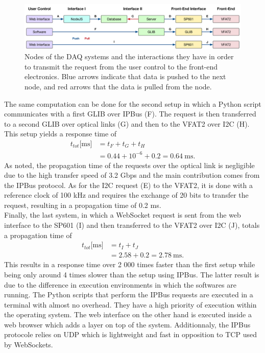       \begin{figure}[t!]
        \centering
        \includegraphics[width=\textwidth]{img/III-2-web-daq/ctrl_req}
        \caption{Nodes of the DAQ systems and the interactions they have in order to transmit the request from the user control to the front-end electronics. Blue arrows indicate that data is pushed to the next node, and red arrows that the data is pulled from the node.}
        \label{fig:III-2-ctrl-req}
      \end{figure}

      The same computation can be done for the second setup in which a Python script communicates with a first GLIB over IPBus (F). The request is then transferred to a second GLIB over optical links (G) and then to the VFAT2 over I2C (H). This setup yields a response time of
      \begin{equation}
        \begin{split}
          t_{tot}\text{[ms]} & = t_F + t_G + t_H \\
                             & = 0.44 + 10^{-6} + 0.2 = 0.64 \ \text{ms}.
        \end{split}
      \end{equation}
      As noted, the propagation time of the requests over the optical link is negligible due to the high transfer speed of 3.2 Gbps and the main contribution comes from the IPBus protocol. As for the I2C request (E) to the VFAT2, it is done with a reference clock of 100 kHz and requires the exchange of 20 bits to transfer the request, resulting in a propagation time of 0.2 ms. \\

      Finally, the last system, in which a WebSocket request is sent from the web interface to the SP601 (I) and then transferred to the VFAT2 over I2C (J), totals a propagation time of
      \begin{equation}
        \begin{split}
          t_{tot}\text{[ms]} & = t_I + t_J \\
                             & = 2.58 + 0.2 = 2.78 \ \text{ms}.
        \end{split}
      \end{equation}
      This results in a response time over 2 000 times faster than the first setup while being only around 4 times slower than the setup using IPBus. The latter result is due to the difference in execution environments in which the softwares are running. The Python scripts that perform the IPBus requests are executed in a terminal with almost no overhead. They have a high priority of execution within the operating system. The web interface on the other hand is executed inside a web browser which adds a layer on top of the system. Additionnaly, the IPBus protocole relies on UDP which is lightweight and fast in opposition to TCP used by WebSockets. \\

